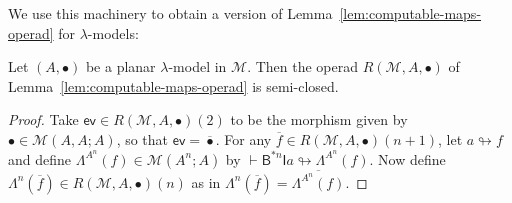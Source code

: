 \documentclass{llncs}
\begin{document}
We use this machinery to obtain a version of Lemma~\ref{lem:computable-maps-operad} for $\lambda$-models:
\begin{lemma}\label{lem:computable-semi-closed}
  Let $(A,\bullet)$ be a planar $\lambda$-model in $\mathcal{M}$. Then the operad $R(\mathcal{M},A,\bullet)$ of Lemma~\ref{lem:computable-maps-operad} is semi-closed.
\end{lemma}
\begin{proof}
  Take $\mathsf{ev} \in R(\mathcal{M},A,\bullet)(2)$ to be the morphism given by $\bullet \in \mathcal{M}(A,A;A)$, so that $\mathsf{ev} = \overline{\bullet}$. For any $\overline{f} \in R(\mathcal{M},A,\bullet)(n+1)$, let $a \looparrowright f$ and define $\Lambda^{A^n}(f) \in \mathcal{M}(A^n;A)$ by $\vdash \mathsf{B}^{*n}\mathsf{I}a \looparrowright \Lambda^{A^n}(f)$. Now define $\Lambda^n(\overline{f}) \in R(\mathcal{M},A,\bullet)(n)$ as in $\Lambda^n(\overline{f}) = \overline{\Lambda^{A^n}(f)}$.


\end{proof}
\end{document}
